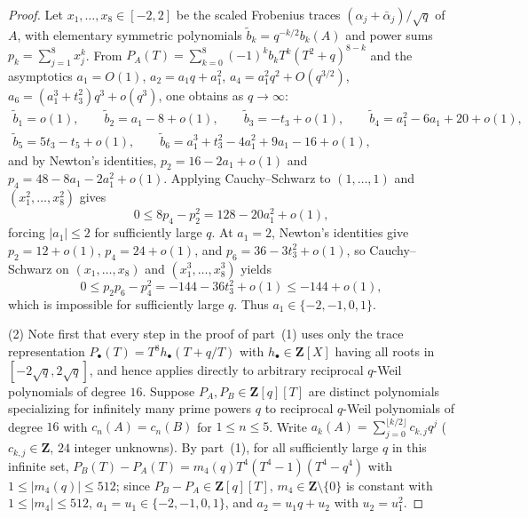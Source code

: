 \documentclass[11pt]{amsart}
\theoremstyle{remark}
\newcommand{\Z}{\mathbf{Z}}
\begin{document}
\begin{proof}
Let $x_1, \dots, x_8 \in [-2, 2]$ be the scaled Frobenius traces $(\alpha_j + \bar{\alpha}_j)/\sqrt{q}$ of $A$, with elementary symmetric polynomials $\tilde{b}_k = q^{-k/2} b_k(A)$ and power sums $p_k = \sum_{j=1}^8 x_j^k$. From $P_A(T) = \sum_{k=0}^8 (-1)^k b_k T^k(T^2 + q)^{8-k}$ and the asymptotics $a_1 = O(1)$, $a_2 = a_1 q + a_1^2$, $a_4 = a_1^2 q^2 + O(q^{3/2})$, $a_6 = (a_1^3 + t_3^2) q^3 + o(q^3)$, one obtains as $q \to \infty$:
\begin{gather*}
\tilde{b}_1 = o(1), \qquad \tilde{b}_2 = a_1 - 8 + o(1), \qquad \tilde{b}_3 = -t_3 + o(1), \qquad \tilde{b}_4 = a_1^2 - 6 a_1 + 20 + o(1), \\
\tilde{b}_5 = 5 t_3 - t_5 + o(1), \qquad \tilde{b}_6 = a_1^3 + t_3^2 - 4 a_1^2 + 9 a_1 - 16 + o(1),
\end{gather*}
and by Newton's identities, $p_2 = 16 - 2 a_1 + o(1)$ and $p_4 = 48 - 8 a_1 - 2 a_1^2 + o(1)$. Applying Cauchy--Schwarz to $(1, \dots, 1)$ and $(x_1^2, \dots, x_8^2)$ gives
\[
0 \le 8 p_4 - p_2^2 = 128 - 20 a_1^2 + o(1),
\]
forcing $|a_1| \le 2$ for sufficiently large $q$. At $a_1 = 2$, Newton's identities give $p_2 = 12 + o(1)$, $p_4 = 24 + o(1)$, and $p_6 = 36 - 3 t_3^2 + o(1)$, so Cauchy--Schwarz on $(x_1, \dots, x_8)$ and $(x_1^3, \dots, x_8^3)$ yields
\[
0 \le p_2 p_6 - p_4^2 = -144 - 36 t_3^2 + o(1) \le -144 + o(1),
\]
which is impossible for sufficiently large $q$. Thus $a_1 \in \{-2, -1, 0, 1\}$.

(2) Note first that every step in the proof of part~(1) uses only the trace representation $P_\bullet(T) = T^8 h_\bullet(T + q/T)$ with $h_\bullet \in \Z[X]$ having all roots in $[-2\sqrt{q}, 2\sqrt{q}]$, and hence applies directly to arbitrary reciprocal $q$-Weil polynomials of degree $16$. Suppose $P_A, P_B \in \Z[q][T]$ are distinct polynomials specializing for infinitely many prime powers $q$ to reciprocal $q$-Weil polynomials of degree $16$ with $c_n(A) = c_n(B)$ for $1 \le n \le 5$. Write $a_k(A) = \sum_{j=0}^{\lfloor k/2 \rfloor} c_{k,j} q^j$ ($c_{k,j} \in \Z$, $24$ integer unknowns). By part~(1), for all sufficiently large $q$ in this infinite set, $P_B(T) - P_A(T) = m_4(q) T^4(T^4 - 1)(T^4 - q^4)$ with $1 \le |m_4(q)| \le 512$; since $P_B - P_A \in \Z[q][T]$, $m_4 \in \Z \setminus \{0\}$ is constant with $1 \le |m_4| \le 512$, $a_1 = u_1 \in \{-2, -1, 0, 1\}$, and $a_2 = u_1 q + u_2$ with $u_2 = u_1^2$.


\end{proof}
\end{document}
